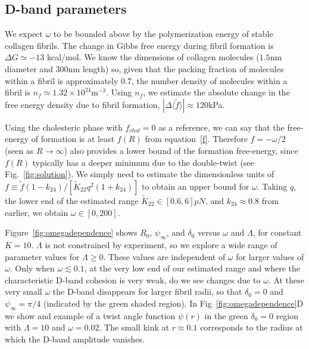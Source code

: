\documentclass[twoside,twocolumn,9pt]{article}
\begin{document}
\subsection{D-band parameters}
We expect $\omega$ to be bounded above by the polymerization energy of stable collagen fibrils. The change in Gibbs free energy during fibril formation is $\Delta G \simeq -13$ kcal/mol.\cite{Kadler:1987}  We know the dimensions of collagen molecules ($1.5$nm diameter and $300$nm length) so, given that the packing fraction of molecules within a fibril is approximately 0.7,\cite{Toroian:2007} the number density of molecules within a fibril is  $n_f \simeq 1.32\times 10^{24}$m$^{-3}$. Using $n_f$, we  estimate the absolute change in the free energy density due to fibril formation, $|\Delta\langle \tilde{f}\rangle| \approx 120$kPa. 

Using the cholesteric phase with $f_{chol}=0$ as a reference, we can say that the free-energy of formation is at least $f(R)$ from equation~\ref{f}. Therefore $f = - \omega/2$ (seen as $R \rightarrow \infty$) also provides a lower bound of the formation free-energy, since $f(R)$ typically has a deeper minimum due to the double-twist (see Fig.~\ref{fig:solution}). We simply need to estimate the dimensionless units of $f \equiv \tilde{f}(1-k_{24})/\left[\tilde{K}_{22}q^2(1+k_{24})\right]$ to obtain an upper bound for $\omega$.  Taking $q$, the lower end of the estimated range $\tilde{K}_{22} \in [0.6,6]pN$,\cite{Cameron:2018} and $k_{24} \approx 0.8$ from earlier, we obtain $\omega \in [0,200]$.  

Figure~\ref{fig:omegadependence} shows  $R_0$, $\psi_\infty$, and $\delta_0$ versus $\omega$ and $\Lambda$, for constant $K=10$. $\Lambda$ is not constrained by experiment, so we explore a wide range of parameter values for $\Lambda \geq 0$. These values are independent of $\omega$ for larger values of $\omega$.  Only when $\omega \lesssim 0.1$, at the very low end of our estimated range and where the characteristic D-band cohesion is very weak, do we see changes due to $\omega$. At these very small $\omega$ the D-band disappears for larger fibril radii, so that   $\delta_0=0$ and $\psi_\infty= \pi/4$ (indicated by the green shaded region). In Fig~\ref{fig:omegadependence}D we show and example of a twist angle function $\psi(r)$ in the green $\delta_0=0$ region with $\Lambda=10$ and $\omega=0.02$. The small kink at $r \approx 0.1$ corresponds to the radius at which the D-band amplitude vanishes.
\end{document}
